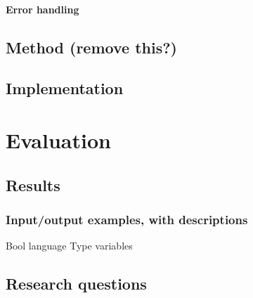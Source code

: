 \documentclass[nofilelist]{cslthse-msc}
\begin{document}
\subsubsection{Error handling}


\section{Method (remove this?)} %



\cite{Hedin2011}
\section{Implementation} %

\chapter{Evaluation} %
\section{Results} %
\subsection{Input/output examples, with descriptions} %
Bool language
Type variables
\section{Research questions}
\end{document}
